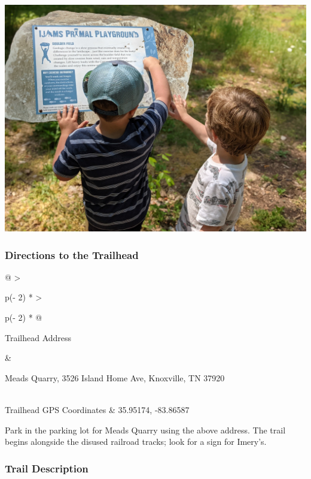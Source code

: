 \documentclass[
  letterpaper,
  DIV=11,
  numbers=noendperiod]{scrartcl}
\begin{document}
\includegraphics{img/trail-08-figure-01.jpg}

\hypertarget{directions-to-the-trailhead-7}{%
\subsubsection{Directions to the
Trailhead}\label{directions-to-the-trailhead-7}}

\begin{longtable}[]{@{}
  >{\raggedright\arraybackslash}p{(\columnwidth - 2\tabcolsep) * }
  >{\raggedright\arraybackslash}p{(\columnwidth - 2\tabcolsep) * }@{}}
\toprule\noalign{}
\begin{minipage}[b]{\linewidth}\raggedright
Trailhead Address
\end{minipage} & \begin{minipage}[b]{\linewidth}\raggedright
Meads Quarry, 3526 Island Home Ave, Knoxville, TN 37920
\end{minipage} \\
\midrule\noalign{}
\endhead
\bottomrule\noalign{}
\endlastfoot
Trailhead GPS Coordinates & 35.95174, -83.86587 \\
\end{longtable}

Park in the parking lot for Meads Quarry using the above address. The
trail begins alongside the disused railroad tracks; look for a sign for
Imery's.

\hypertarget{trail-description-7}{%
\subsubsection{Trail Description}\label{trail-description-7}}
\end{document}
